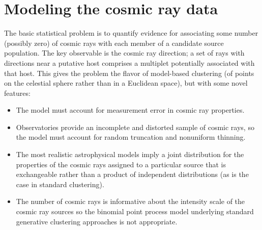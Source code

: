 \section{Modeling the cosmic ray data}


The basic statistical problem is to quantify evidence for associating some
number (possibly zero) of cosmic rays with each member of a candidate
source population.  The key observable is the cosmic ray direction; a set of
rays with directions near a putative host comprises a multiplet potentially
associated with that host.  This gives the problem the flavor of model-based
clustering (of points on the celestial sphere rather than in a Euclidean space),
but with some novel features:
\begin{itemize}
\item The model must account for measurement error in cosmic ray properties.

\item Observatories provide an incomplete and distorted sample of cosmic rays,
so the model must account for random truncation and nonuniform thinning.

\item The most realistic astrophysical models imply a joint distribution for
the properties of the cosmic rays assigned to a particular source that is
exchangeable rather than a product of independent distributions (as is the
case in standard clustering).

\item The number of cosmic rays is informative about the intensity scale of
the cosmic ray sources so the binomial point process model underlying
standard generative clustering approaches is not appropriate.
\end{itemize}


